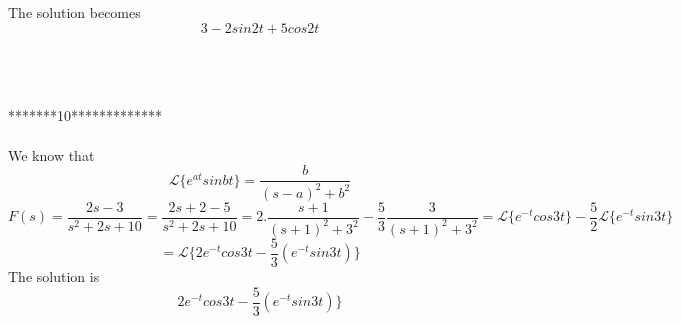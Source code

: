 \documentclass[onecolumn]{IEEEtran}
\begin{document}
The solution becomes
\begin{equation}
 3-2sin2t+ 5cos2t
 \end{equation}

\\
\\
\\

*******10*************
\\
\\

We know that
\begin{equation}
\mathscr{L}\{e^{at}sinbt\}=\frac{b}{(s-a)^2+b^2}
\end{equation}
\begin{equation}
 F(s)=\frac{2s-3}{s^2+2s+10}=\frac{2s+2-5}{s^2+2s+10}=2.\frac{s+1}{(s+1)^2+3^2}-\frac{5}{3}\frac{3}{(s+1)^2+3^2}=\mathscr{L}\{e^{-t}cos3t\}
 -\frac{5}{2}\mathscr{L}\{e^{-t}sin3t\}
 \end{equation}
 \begin{equation}
 =\mathscr{L}\{2e^{-t}cos3t-\frac{5}{3}(e^{-t}sin3t)\}
\end{equation}
The solution is
\begin{equation}
2e^{-t}cos3t-\frac{5}{3}(e^{-t}sin3t)\}
\end{equation}
\end{document}
